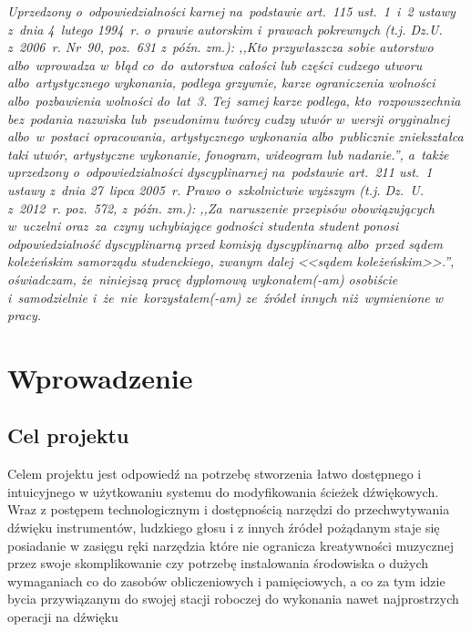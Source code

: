 \documentclass[11pt]{aghdpl}
\begin{document}
\maketitle
\thispagestyle{empty} 
{\large\itshape Uprzedzony o~odpowiedzialno\'sci karnej na~podstawie art.~115 ust.~1~i~2 ustawy z~dnia 4~lutego 1994~r. o~prawie autorskim i~prawach pokrewnych (t.j. Dz.U. z~2006~r. Nr~90, poz.~631 z~p{\'o}{\'z}n. zm.): ,,Kto przyw\l{}aszcza sobie autorstwo albo~wprowadza w~b\l{}\k{a}d co~do~autorstwa ca\l{}o\'sci lub cz\k{e}\'sci cudzego utworu albo~artystycznego wykonania, podlega grzywnie, karze ograniczenia wolno\'sci albo~pozbawienia wolno\'sci do~lat~3. Tej~samej karze podlega, kto~rozpowszechnia bez~podania nazwiska lub~pseudonimu tw\'orcy cudzy utw\'or w~wersji oryginalnej albo~w~postaci opracowania, artystycznego wykonania albo~publicznie zniekszta\l{}ca taki utw\'or, artystyczne wykonanie, fonogram, wideogram lub nadanie.'', a~tak\.ze uprzedzony o~odpowiedzialno\'sci dyscyplinarnej na~podstawie art.~211 ust.~1 ustawy z~dnia 27~lipca 2005~r. Prawo o~szkolnictwie wy\.zszym (t.j. Dz.~U. z~2012~r. poz.~572, z~p\'o\'zn. zm.): ,,Za~naruszenie przepis\'ow obowi\k{a}zuj\k{a}cych w~uczelni oraz~za~czyny uchybiaj\k{a}ce godno\'sci studenta student ponosi odpowiedzialno\'s\'c dyscyplinarn\k{a} przed komisj\k{a} dyscyplinarn\k{a} albo~przed s\k{a}dem kole\.ze\'nskim samorz\k{a}du studenckiego, zwanym dalej <<s\k{a}dem kole\.ze\'nskim>>.'', o\'swiadczam, \.ze~niniejsz\k{a} prac\k{e} dyplomow\k{a} wykona\l{}em(-am) osobi\'scie i~samodzielnie i~\.ze~nie~korzysta\l{}em(-am) ze~\'zr\'ode\l{} innych ni\.z~wymienione w pracy. }
\clearpage
\tableofcontents
\chapter{Wprowadzenie}
\section{Cel projektu} 
\setlength{\parindent}{10ex} \par Celem projektu jest odpowiedź na potrzebę stworzenia łatwo dostępnego i intuicyjnego w użytkowaniu systemu do modyfikowania ścieżek dźwiękowych. Wraz z postępem technologicznym i dostępnością narzędzi do przechwytywania dźwięku instrumentów, ludzkiego głosu i z innych źródeł pożądanym staje się posiadanie w zasięgu ręki narzędzia które nie ogranicza kreatywności muzycznej przez swoje skomplikowanie czy potrzebę instalowania środowiska o dużych wymaganiach co do zasobów obliczeniowych i pamięciowych, a co za tym idzie bycia przywiązanym do swojej stacji roboczej do wykonania nawet najprostrzych operacji na dźwięku
\end{document}
